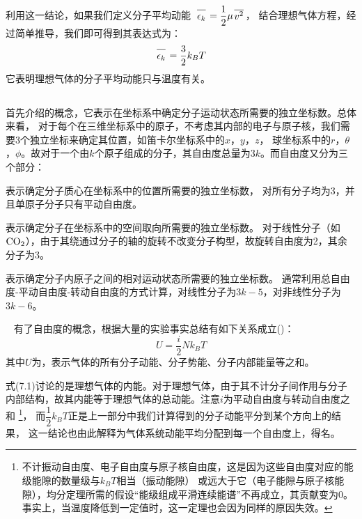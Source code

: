             利用这一结论，如果我们定义分子平均动能\ $\upperline{\epsilon_{k}} = \dfrac{1}{2} \mu \upperline{v^{2}}$，
            结合理想气体方程，经过简单推导，我们即可得到其表达式为：
            \begin{equation}
                \upperline{\epsilon_{k}} = \frac{3}{2}k_{B}T
                \nonumber
            \end{equation}
            它表明理想气体的分子平均动能只与温度有关。
        \subsection[能量均分原理]{}
            首先介绍的概念，它表示在坐标系中确定分子运动状态所需要的独立坐标数。总体来看，
            对于每个在三维坐标系中的原子，不考虑其内部的电子与原子核，我们需要3个独立坐标来确定其位置，如笛卡尔坐标系中的$x$，$y$，$z$，
            球坐标系中的$r$，$\theta$，$\phi$。故对于一个由$k$个原子组成的分子，其自由度总量为$3k$。而自由度又分为三个部分：
            \begin{Itemize}
                \item {}表示确定分子质心在坐标系中的位置所需要的独立坐标数，
                对所有分子均为3，并且单原子分子只有平动自由度。
                \item {}表示确定分子在坐标系中的空间取向所需要的独立坐标数。
                对于线性分子（如$\rm{CO_{2}}$），由于其绕通过分子的轴的旋转不改变分子构型，故旋转自由度为2，其余分子为3。
                \item {}表示确定分子内原子之间的相对运动状态所需要的独立坐标数。
                通常利用总自由度-平动自由度-转动自由度的方式计算，对线性分子为$3k-5$，对非线性分子为$3k-6$。
            \end{Itemize}
            \ \newline 
            有了自由度的概念，根据大量的实验事实总结有如下关系成立()：
            \begin{equation}
                U = \frac{i}{2}Nk_{B}T
            \end{equation}
            其中$U$为，表示气体的所有分子动能、分子势能、分子内部能量等之和。
            
            式(7.1)讨论的是理想气体的内能。对于理想气体，由于其不计分子间作用与分子内部结构，故其内能等于理想气体的总动能。注意$i$为平动自由度与转动自由度之和
            \footnote{不计振动自由度、电子自由度与原子核自由度，这是因为这些自由度对应的能级能隙的数量级与$k_{B}T$相当（振动能隙）
            或远大于它（电子能隙与原子核能隙），均分定理所需的假设“能级组成平滑连续能谱”不再成立，其贡献变为$0$。
            事实上，当温度降低到一定值时，这一定理也会因为同样的原因失效。}，
            而$\dfrac{1}{2}k_{B}T$正是上一部分中我们计算得到的分子动能平分到某个方向上的结果，
            这一结论也由此解释为气体系统动能平均分配到每一个自由度上，得名。
